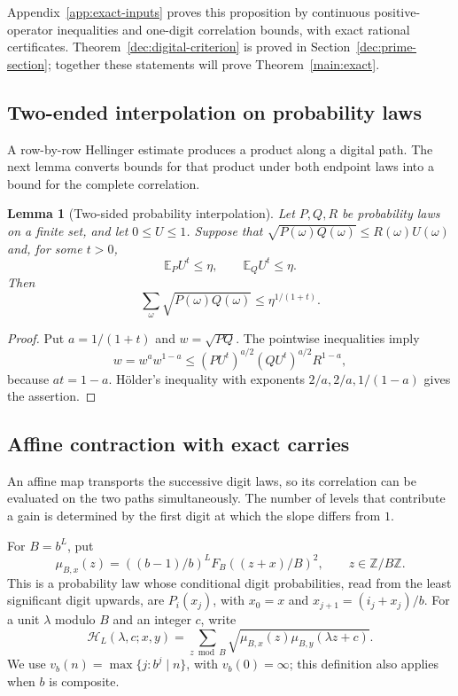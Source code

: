 \documentclass[11pt,a4paper]{article}
\theoremstyle{paperplain}
\newtheorem{lemma}[theorem]{Lemma}
\numberwithin{equation}{section}
\begin{document}
Appendix~\ref{app:exact-inputs} proves this proposition by continuous
positive-operator inequalities and one-digit correlation bounds, with
exact rational certificates. Theorem~\ref{dec:digital-criterion} is
proved in Section~\ref{dec:prime-section}; together these statements
will prove Theorem~\ref{main:exact}.

\subsection{Two-ended interpolation on probability laws}

A row-by-row Hellinger estimate produces a product along a digital path.
The next lemma converts bounds for that product under both endpoint laws
into a bound for the complete correlation.

\begin{lemma}[Two-sided probability interpolation]\label{dec:twoended}
Let $P,Q,R$ be probability laws on a finite set, and let $0\le U\le1$.
Suppose that $\sqrt{P(\omega)Q(\omega)}\le R(\omega)U(\omega)$ and,
for some $t>0$,
\[
 \mathbb E_P U^t\le\eta,\qquad \mathbb E_Q U^t\le\eta.
\]
Then
\[
 \sum_\omega\sqrt{P(\omega)Q(\omega)}
 \le\eta^{1/(1+t)}.
\]
\end{lemma}
\begin{proof}
Put $a=1/(1+t)$ and $w=\sqrt{PQ}$. The pointwise inequalities imply
\[
 w=w^a w^{1-a}
 \le(PU^t)^{a/2}(QU^t)^{a/2}R^{1-a},
\]
because $at=1-a$. H\"older's inequality with exponents
$2/a,2/a,1/(1-a)$ gives the assertion.
\end{proof}

\subsection{Affine contraction with exact carries}

An affine map transports the successive digit laws, so its correlation
can be evaluated on the two paths simultaneously. The number of levels
that contribute a gain is determined by the first digit at which the
slope differs from $1$.

For $B=b^L$, put
\[
 \mu_{B,x}(z)=((b-1)/b)^L F_B((z+x)/B)^2,
 \qquad z\in\mathbb Z/B\mathbb Z.
\]
This is a probability law whose conditional digit probabilities, read from
the least significant digit upwards, are $P_i(x_j)$, with
$x_0=x$ and $x_{j+1}=(i_j+x_j)/b$.
For a unit $\lambda$ modulo $B$ and an integer $c$, write
\[
 \mathcal H_L(\lambda,c;x,y)
 =\sum_{z\bmod B}\sqrt{\mu_{B,x}(z)\mu_{B,y}(\lambda z+c)}.
\]
We use $v_b(n)=\max\{j:b^j\mid n\}$, with $v_b(0)=\infty$;
this definition also applies when $b$ is composite.
\end{document}
